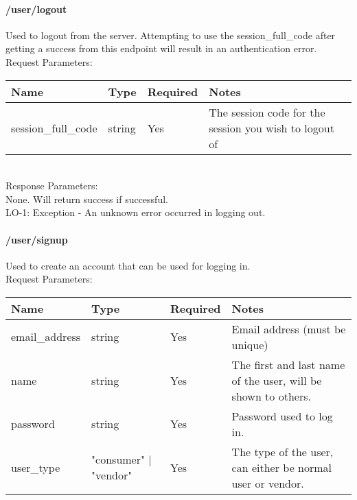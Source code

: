 \documentclass{article}[11pt]
\begin{document}
\paragraph{/user/logout}\textbf{}

Used to logout from the server. Attempting to use the session\_full\_code after getting a success from this endpoint will result in an authentication error.  \\

\noindent
Request Parameters:

\noindent
\begin{tabular}{|l|l|l|l|}
\hline
\textbf{Name} & \textbf{Type} & \textbf{Required} & \textbf{Notes} \\
\hline
session\_full\_code & string & Yes & The session code for the session you wish to logout of \\
\hline
\end{tabular} \\

\noindent
Response Parameters: \\
None. Will return success if successful. \\

\ErrorsSession
LO-1: Exception - An unknown error occurred in logging out.

\newpage

\paragraph{/user/signup}\textbf{}

Used to create an account that can be used for logging in.  \\

\noindent
Request Parameters:

\noindent
\begin{tabular}{|l|l|l|l|}
\hline
\textbf{Name} & \textbf{Type} & \textbf{Required} & \textbf{Notes} \\
\hline
email\_address & string & Yes & Email address (must be unique) \\
\hline
name & string & Yes & The first and last name of the user, will be shown to others. \\
\hline
password & string & Yes & Password used to log in. \\
\hline
user\_type & "consumer" $\vert$ "vendor" & Yes & The type of the user, can either be normal user or vendor. \\
\hline
\end{tabular} \\
\end{document}
